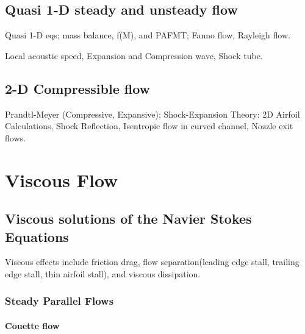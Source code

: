 \documentclass[oneside,a4paper,11pt]{report}
\begin{document}
\chapter{Quasi 1-D steady and unsteady flow}
Quasi 1-D eqs; mass balance, f(M), and PAFMT; Fanno flow, Rayleigh flow.

Local acoustic speed, Expansion and Compression wave, Shock tube.

\chapter{2-D Compressible flow}
Prandtl-Meyer (Compressive, Expansive); Shock-Expansion Theory: 2D Airfoil Calculations, Shock Reflection, Isentropic flow in curved channel, Nozzle exit flows.

\part{Viscous Flow}

\chapter{Viscous solutions of the Navier Stokes Equations}
Viscous effects include friction drag, flow separation(leading edge stall, trailing edge stall, thin airfoil stall), and viscous dissipation.

\section{Steady Parallel Flows}

\subsection{Couette flow} 
\end{document}
